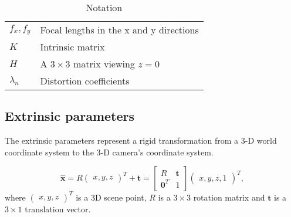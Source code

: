 \documentclass[
  twocolumn,
]{article} %
\begin{document}
\begin{table}[htbp]
\begin{tabularx}{\columnwidth}{lL}
		\(f_x, f_y\)                   & Focal lengths in the x and y directions                           \\
		\(K\)                          & Intrinsic matrix                                                  \\
		\(H\)                          & A \(3 \times 3\) matrix viewing \(z=0\)                           \\
		\(\lambda_n\)                  & Distortion coefficients                                           \\
		\bottomrule
	\end{tabularx}
	\caption{Notation}
	\label{tab:notation}
\end{table}

\subsection{Extrinsic parameters}\label{sub:extrinsic_parameters}

The extrinsic parameters represent a rigid transformation from a 3-D world
coordinate system to the 3-D camera’s coordinate system.

\begin{equation*}
	\hat{\mathbf{x}} =
	R \begin{pmatrix}
		x, y, z
	\end{pmatrix}^{T} + \mathbf{t} =
	\begin{bmatrix}
		R              & \mathbf{t} \\
		\mathbf{0}^{T} & 1
	\end{bmatrix} \begin{pmatrix}
		x, y, z, 1
	\end{pmatrix}^{T},
\end{equation*}
where
\(\begin{pmatrix}
	x, y, z
\end{pmatrix}^{T}\) is a 3D scene point,
\(R\) is a \(3 \times 3\) rotation matrix
and \(\mathbf{t}\) is
a \(3 \times 1\) translation vector.
\end{document}
